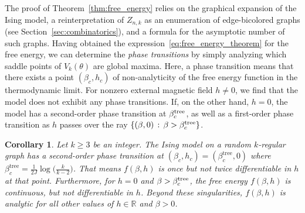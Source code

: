 \documentclass{article}
\numberwithin{theorem}{section}
\newtheorem{corollary}[theorem]{Corollary}
\theoremstyle{remark}
\newcommand{\RR}{\mathbb{R}}
\begin{document}
The proof of Theorem~\ref{thm:free_energy} relies on the graphical expansion of the Ising model, a reinterpretation of $Z_{n,k}$ as an enumeration of edge-bicolored graphs (see Section~\ref{sec:combinatorics}), and a formula for the asymptotic number of such graphs. Having obtained the expression~\eqref{eq:free_energy_theorem} for the free energy, we can determine the \emph{phase transitions} by simply analyzing which saddle points of $V_k(\theta)$ are global maxima. Here, a phase transition means that there exists a point $(\beta_c,h_c)$ of non-analyticity of the free energy function in the thermodynamic limit.
For nonzero external magnetic field $h \neq 0$, we find that the model does not exhibit any phase transitions. If, on the other hand, $h = 0$, the model has a second-order phase transition at $\beta_c^{\rm tree}$, as well as a first-order phase transition as $h$ passes over the ray $\{(\beta,0) \,:\, \beta > \beta_c^{\rm tree}\}$.

\begin{corollary}
  \label{cor:phase_transitions}
  Let $k\geq 3$ be an integer. The Ising model on a random \mbox{$k$-regular} graph has a second-order phase transition at $(\beta_c, h_c) = (\beta_c^{\mathrm{tree}}, 0)$ where $\beta_c^{\mathrm{tree}} = \frac{1}{2J}\log\big(\frac{k}{k-2}\big)$. That means $f(\beta,h)$ is once but not twice differentiable in $h$ at that point. 
  Furthermore, for $h=0$ and $\beta > \beta_c^{\rm tree}$, the free energy $f(\beta, h)$ is continuous, but not differentiable in $h$. Beyond these singularities, $f(\beta,h)$ is analytic for all other values of $h \in \RR$ and $\beta > 0$.
\end{corollary}
\end{document}
